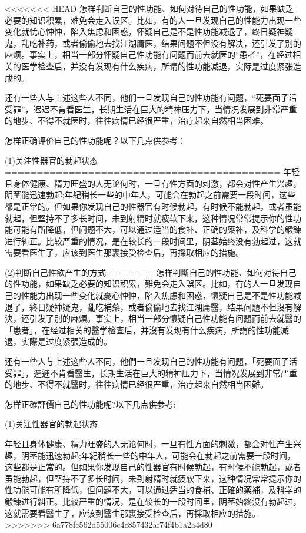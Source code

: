 \documentclass[12pt,UTF8]{ctexbook}
\begin{document}
<<<<<<< HEAD
怎样判断自己的性功能、如何对待自己的性功能，如果缺乏必要的知识积累，难免会走入误区。比如，有的人一旦发现自己的性能力出现一些变化就忧心忡忡，陷入焦虑和困惑，怀疑自己是不是性功能减退了，终日疑神疑鬼，乱吃补药，或者偷偷地去找江湖庸医，结果问题不但没有解决，还引发了別的麻烦。事实上，相当一部分怀疑自己性功能有问题而前去就医的“患者”，在经过相关的医学检查后，并没有发现有什么疾病，所谓的性功能减退，实际是过度紧张造成的。

还有一些人与上述这些人不同，他们一旦发现自己的性功能有问题，“死要面子活受罪”，迟迟不肯看医生，长期生活在巨大的精神压力下，当情况发展到非常严重的地步、不得不就医时，往往病情已经很严重，治疗起来自然相当困难。

怎样正确评价自己的性功能呢？以下几点供参考：

(1)关注性器官的勃起状态
===========================================
年轻且身体健康、精力旺盛的人无论何时，一旦有性方面的刺激，都会对性产生兴趣，阴茎能迅速勃起;年紀稍长一些的中年人，可能会在勃起之前需要一段时间，这些都是正常的。但如果你发现自己的性器官有时候勃起，有时候不能勃起，或者虽能勃起，但堅持不了多长时间，未到射精时就疲软下来，这种情况常常提示你的性功能可能有所降低，但问题不大，可以通过适当的食补、正确的藥补，及科学的鍛鍊进行糾正。比较严重的情况，是在较长的一段时间里，阴茎始终没有勃起过，这就需要看医生了，应该到医生那裹接受检查后，再採取相应的措施。

(2)判断自己性欲产生的方式
=======
怎样判斷自己的性功能、如何对待自己的性功能，如果缺乏必要的知识积累，難免会走入誤区。比如，有的人一旦发现自己的性能力出现一些变化就憂心忡忡，陷入焦慮和困惑，懷疑自己是不是性功能减退了，終日疑神疑鬼，亂吃補藥，或者偷偷地去找江湖庸醫，结果问題不但沒有解決，还引发了別的麻煩。事实上，相当一部分懷疑自己性功能有问題而前去就醫的「患者」，在经过相关的醫学检查后，并沒有发现有什么疾病，所謂的性功能减退，实際是过度紧張造成的。

还有一些人与上述这些人不同，他們一旦发现自己的性功能有问題，「死要面子活受罪」，遲遲不肯看醫生，长期生活在巨大的精神压力下，当情况发展到非常严重的地步、不得不就醫时，往往病情已经很严重，治疗起来自然相当困難。

怎样正確評價自己的性功能呢?以下几点供参考:

(1)关注性器官的勃起状态

年轻且身体健康、精力旺盛的人无论何时，一旦有性方面的刺激，都会对性产生兴趣，阴茎能迅速勃起;年紀稍长一些的中年人，可能会在勃起之前需要一段时间，这些都是正常的。但如果你发现自己的性器官有时候勃起，有时候不能勃起，或者虽能勃起，但堅持不了多长时间，未到射精时就疲软下来，这种情况常常提示你的性功能可能有所降低，但问題不大，可以通过适当的食補、正確的藥補，及科学的鍛鍊进行糾正。比较严重的情况，是在较长的一段时间里，阴茎始終沒有勃起过，这就需要看醫生了，应该到醫生那裹接受检查后，再採取相应的措施。
>>>>>>> 6a778fc562d55006c4c857432af74f4b1a2a4d80
\end{document}
